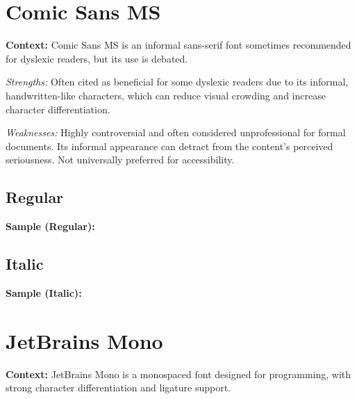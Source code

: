 \pagebreak
\section{Comic Sans MS}\label{app5:trouble9}
\noindent
\textbf{Context:} Comic Sans MS is an informal sans-serif font sometimes recommended for dyslexic readers, but its use is debated.

\begin{raggedright}
	\emph{Strengths:} Often cited as beneficial for some dyslexic readers due to its informal, handwritten-like characters, which can reduce visual crowding and increase character differentiation.

	\emph{Weaknesses:} Highly controversial and often considered unprofessional for formal documents. Its informal appearance can detract from the content's perceived seriousness. Not universally preferred for accessibility.

	\subsection{Regular}
	\noindent\textbf{Sample (Regular):}
	\FontSample{\comicsansfont}

	\subsection{Italic}
	\noindent\textbf{Sample (Italic):}
	\FontSample{{\comicsansfont\itshape}}
\end{raggedright}


\pagebreak
\hypertarget{trouble10}{}\section[JetBrains Mono]{JetBrains Mono \supercite{JetBrainsMono}}\label{app5:trouble10}
\noindent
\textbf{Context:} JetBrains Mono is a monospaced font designed for programming, with strong character differentiation and ligature support.

